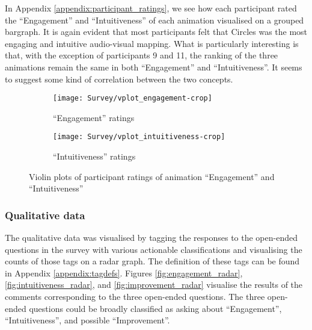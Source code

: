 \documentclass[../initial_thesis.tex]{subfiles}
\begin{document}
In Appendix \ref{appendix:participant_ratings}, we see how each participant rated the ``Engagement'' and ``Intuitiveness'' of each animation visualised on a grouped bargraph. It is again evident that most participants felt that Circles was the most engaging and intuitive audio-visual mapping. What is particularly interesting is that, with the exception of participants 9 and 11, the ranking of the three animations remain the same in both ``Engagement'' and ``Intuitiveness''. It seems to suggest some kind of correlation between the two concepts.

\begin{figure}
  \begin{subfigure}{0.5\textwidth}
    \centering
    \texttt{[image: Survey/vplot\_engagement-crop]}
    \caption{``Engagement'' ratings}
    \label{fig:engagement_ratings}
  \end{subfigure}
  \begin{subfigure}{0.5\textwidth}
    \centering
    \texttt{[image: Survey/vplot\_intuitiveness-crop]}
    \caption{``Intuitiveness'' ratings}
    \label{fig:intuitive_ratings}
  \end{subfigure}
  \caption{Violin plots of participant ratings of animation ``Engagement'' and ``Intuitiveness''}
  \label{fig:vplot_ratings}
\end{figure}

\subsubsection{Qualitative data}
The qualitative data was visualised by tagging the responses to the open-ended questions in the survey with various actionable classifications and visualising the counts of those tags on a radar graph. The definition of these tags can be found in Appendix \ref{appendix:tagdefs}. Figures \ref{fig:engagement_radar}, \ref{fig:intuitiveness_radar}, and \ref{fig:improvement_radar} visualise the results of the comments corresponding to the three open-ended questions. The three open-ended questions could be broadly classified as asking about ``Engagement'', ``Intuitiveness'', and possible ``Improvement''.
\end{document}
